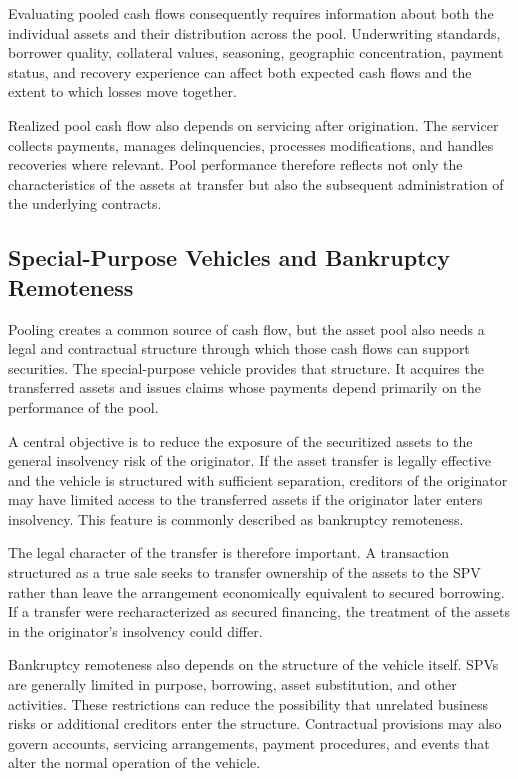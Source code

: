 Evaluating pooled cash flows consequently requires information about both the individual assets and their distribution across the pool. Underwriting standards, borrower quality, collateral values, seasoning, geographic concentration, payment status, and recovery experience can affect both expected cash flows and the extent to which losses move together.

Realized pool cash flow also depends on servicing after origination. The servicer collects payments, manages delinquencies, processes modifications, and handles recoveries where relevant. Pool performance therefore reflects not only the characteristics of the assets at transfer but also the subsequent administration of the underlying contracts.

\subsection[Special-Purpose Vehicles and Bankruptcy Remoteness]{Special-Purpose Vehicles and Bankruptcy Remoteness}

Pooling creates a common source of cash flow, but the asset pool also needs a legal and contractual structure through which those cash flows can support securities. The special-purpose vehicle provides that structure. It acquires the transferred assets and issues claims whose payments depend primarily on the performance of the pool.

A central objective is to reduce the exposure of the securitized assets to the general insolvency risk of the originator. If the asset transfer is legally effective and the vehicle is structured with sufficient separation, creditors of the originator may have limited access to the transferred assets if the originator later enters insolvency. This feature is commonly described as bankruptcy remoteness.

The legal character of the transfer is therefore important. A transaction structured as a true sale seeks to transfer ownership of the assets to the SPV rather than leave the arrangement economically equivalent to secured borrowing. If a transfer were recharacterized as secured financing, the treatment of the assets in the originator's insolvency could differ.

Bankruptcy remoteness also depends on the structure of the vehicle itself. SPVs are generally limited in purpose, borrowing, asset substitution, and other activities. These restrictions can reduce the possibility that unrelated business risks or additional creditors enter the structure. Contractual provisions may also govern accounts, servicing arrangements, payment procedures, and events that alter the normal operation of the vehicle.

